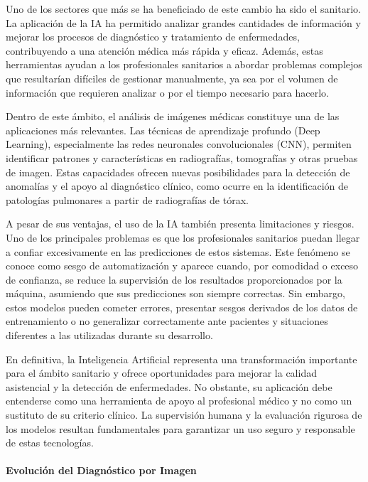 \documentclass[11pt, a4paper]{article}
\numberwithin{equation}{section}
\begin{document}
Uno de los sectores que más se ha beneficiado de este cambio ha sido el sanitario. La aplicación de la IA ha permitido analizar grandes cantidades de información y mejorar los procesos de diagnóstico y tratamiento de enfermedades, contribuyendo a una atención médica más rápida y eficaz. Además, estas herramientas ayudan a los profesionales sanitarios a abordar problemas complejos que resultarían difíciles de gestionar manualmente, ya sea por el volumen de información que requieren analizar o por el tiempo necesario para hacerlo.

Dentro de este ámbito, el análisis de imágenes médicas constituye una de las aplicaciones más relevantes. Las técnicas de aprendizaje profundo (Deep Learning), especialmente las redes neuronales convolucionales (CNN), permiten identificar patrones y características en radiografías, tomografías y otras pruebas de imagen. Estas capacidades ofrecen nuevas posibilidades para la detección de anomalías y el apoyo al diagnóstico clínico, como ocurre en la identificación de patologías pulmonares a partir de radiografías de tórax.

A pesar de sus ventajas, el uso de la IA también presenta limitaciones y riesgos. Uno de los principales problemas es que los profesionales sanitarios puedan llegar a confiar excesivamente en las predicciones de estos sistemas. Este fenómeno se conoce como sesgo de automatización y aparece cuando, por comodidad o exceso de confianza, se reduce la supervisión de los resultados proporcionados por la máquina, asumiendo que sus predicciones son siempre correctas. Sin embargo, estos modelos pueden cometer errores, presentar sesgos derivados de los datos de entrenamiento o no generalizar correctamente ante pacientes y situaciones diferentes a las utilizadas durante su desarrollo.

En definitiva, la Inteligencia Artificial representa una transformación importante para el ámbito sanitario y ofrece oportunidades para mejorar la calidad asistencial y la detección de enfermedades. No obstante, su aplicación debe entenderse como una herramienta de apoyo al profesional médico y no como un sustituto de su criterio clínico. La supervisión humana y la evaluación rigurosa de los modelos resultan fundamentales para garantizar un uso seguro y responsable de estas tecnologías.

\paragraph{Evolución del Diagnóstico por Imagen}
\end{document}

